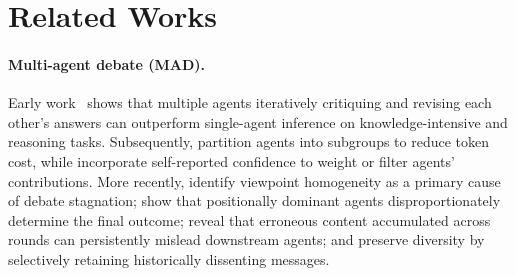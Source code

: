 \section{Related Works}
\label{sec:related-work}

\paragraph{Multi-agent debate (MAD).}
Early work~\cite{du2024multiagentdebate:mad-2,chen2024reconcile:mad-1,liang2024encouraging:mad-3} shows that multiple agents iteratively critiquing and revising each other's answers can outperform single-agent inference on knowledge-intensive and reasoning tasks. 
Subsequently, \citet{liu2024groupdebate} partition agents into subgroups to reduce token cost, while \citet{lin2025enhancing,taubenfeld2025confidence,fu2025deep} incorporate self-reported confidence to weight or filter agents' contributions. More recently, \citet{zhu2026demystifying} identify viewpoint homogeneity as a primary cause of debate stagnation; \citet{zhang2026key} show that positionally dominant agents disproportionately determine the final outcome; \citet{tian2026multi} reveal that erroneous content accumulated across rounds can persistently mislead downstream agents; and \citet{nguyen2026hear} preserve diversity by selectively retaining historically dissenting messages. 


